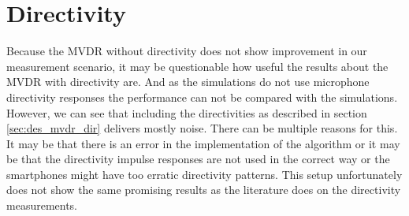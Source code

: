 \section{Directivity}
\label{sec:conc:dir}
Because the MVDR without directivity does not show improvement in our measurement scenario, it may be questionable how useful the results about the MVDR with directivity are. And as the simulations do not use microphone directivity responses the performance can not be compared with the simulations. However, we can see that including the directivities as described in section \ref{sec:des_mvdr_dir} delivers mostly noise. There can be multiple reasons for this. It may be that there is an error in the implementation of the algorithm or it may be that the directivity impulse responses are not used in the correct way or the smartphones might have too erratic directivity patterns. This setup unfortunately does not show the same promising results as the literature does on the directivity measurements.